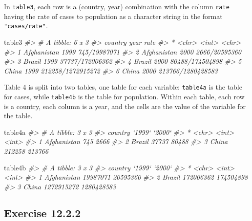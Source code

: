 \documentclass[]{book}
\newenvironment{Shaded}{\begin{snugshade}}{\end{snugshade}}
\newcommand{\CommentTok}[1]{\textcolor[rgb]{0.56,0.35,0.01}{\textit{#1}}}
\newcommand{\NormalTok}[1]{#1}
\theoremstyle{plain}
\theoremstyle{remark}
\theoremstyle{definition}
\theoremstyle{definition}
\theoremstyle{definition}
\theoremstyle{remark}
\begin{document}
In \texttt{table3}, each row is a (country, year) combination with the
column \texttt{rate} having the rate of cases to population as a
character string in the format \texttt{"cases/rate"}.

\begin{Shaded}
\begin{Highlighting}[]
\NormalTok{table3}
\CommentTok{#> # A tibble: 6 x 3}
\CommentTok{#>   country      year rate             }
\CommentTok{#> * <chr>       <int> <chr>            }
\CommentTok{#> 1 Afghanistan  1999 745/19987071     }
\CommentTok{#> 2 Afghanistan  2000 2666/20595360    }
\CommentTok{#> 3 Brazil       1999 37737/172006362  }
\CommentTok{#> 4 Brazil       2000 80488/174504898  }
\CommentTok{#> 5 China        1999 212258/1272915272}
\CommentTok{#> 6 China        2000 213766/1280428583}
\end{Highlighting}
\end{Shaded}

Table 4 is split into two tables, one table for each variable:
\texttt{table4a} is the table for cases, while \texttt{table4b} is the
table for population. Within each table, each row is a country, each
column is a year, and the cells are the value of the variable for the
table.

\begin{Shaded}
\begin{Highlighting}[]
\NormalTok{table4a}
\CommentTok{#> # A tibble: 3 x 3}
\CommentTok{#>   country     `1999` `2000`}
\CommentTok{#> * <chr>        <int>  <int>}
\CommentTok{#> 1 Afghanistan    745   2666}
\CommentTok{#> 2 Brazil       37737  80488}
\CommentTok{#> 3 China       212258 213766}
\end{Highlighting}
\end{Shaded}

\begin{Shaded}
\begin{Highlighting}[]
\NormalTok{table4b}
\CommentTok{#> # A tibble: 3 x 3}
\CommentTok{#>   country         `1999`     `2000`}
\CommentTok{#> * <chr>            <int>      <int>}
\CommentTok{#> 1 Afghanistan   19987071   20595360}
\CommentTok{#> 2 Brazil       172006362  174504898}
\CommentTok{#> 3 China       1272915272 1280428583}
\end{Highlighting}
\end{Shaded}

\hypertarget{exercise-12.2.2}{%
\subsection*{\texorpdfstring{Exercise
{12.2.2}}{Exercise 12.2.2}}\label{exercise-12.2.2}}
\end{document}
